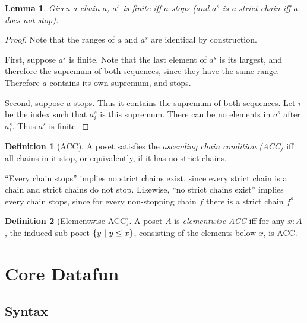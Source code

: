 \documentclass{article}
\theoremstyle{plain}
\newtheorem{lemma}{Lemma}
\theoremstyle{definition}
\newtheorem{definition}{Definition}
\begin{document}
\begin{lemma}
  Given a chain $a$, $a^s$ is finite iff $a$ stops (and $a^s$ is a strict chain
  iff $a$ does not stop).
\end{lemma}
\begin{proof}
  Note that the ranges of $a$ and $a^s$ are identical by construction.

  First, suppose $a^s$ is finite. Note that the last element of $a^s$ is its
  largest, and therefore the supremum of both sequences, since they have the
  same range. Therefore $a$ contains its own supremum, and stops.

  Second, suppose $a$ stops. Thus it contains the supremum of both sequences.
  Let $i$ be the index such that $a^s_i$ is this supremum. There can be no
  elements in $a^s$ after $a^s_i$. Thus $a^s$ is finite.
\end{proof}

\begin{definition}[ACC]
  A poset satisfies the \emph{ascending chain condition (ACC)} iff all chains in
  it stop, or equivalently, if it has no strict chains.
\end{definition}

``Every chain stops'' implies no strict chains exist, since every strict chain
is a chain and strict chains do not stop. Likewise, ``no strict chains exist''
implies every chain stops, since for every non-stopping chain $f$ there is a
strict chain $f^s$.

\begin{definition}[Elementwise ACC]
  A poset $A$ is \emph{elementwise-ACC} iff for any $x : A$, the induced
  sub-poset $\{{{y}~|~{y \le x}}\}$, consisting of the elements below $x$, is ACC.
\end{definition}


\section{Core Datafun}

\subsection{Syntax}
\end{document}
